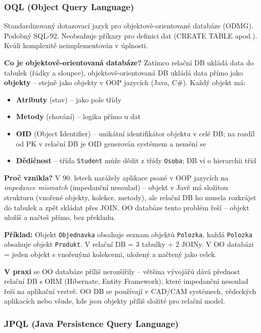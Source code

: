 \subsubsection{OQL (Object Query Language)}

Standardizovaný dotazovací jazyk pro objektově-orientované databáze (ODMG). Podobný SQL-92.
Neobsahuje příkazy pro definici dat (CREATE TABLE apod.). Kvůli komplexitě neimplementován v úplnosti.

\textbf{Co je objektově-orientovaná databáze?}
Zatímco relační DB ukládá data do tabulek (řádky a sloupce), objektově-orientovaná DB ukládá
data přímo jako \textbf{objekty} -- stejně jako objekty v OOP jazycích (Java, C\#).
Každý objekt má:
\begin{itemize}
  \item \textbf{Atributy} (stav) -- jako pole třídy
  \item \textbf{Metody} (chování) -- logika přímo u dat
  \item \textbf{OID} (Object Identifier) -- unikátní identifikátor objektu v celé DB; na rozdíl od PK v relační DB je OID generován systémem a nemění se
  \item \textbf{Dědičnost} -- třída \texttt{Student} může dědit z třídy \texttt{Osoba}; DB ví o hierarchii tříd
\end{itemize}

\textbf{Proč vznikla?} V 90. letech narážely aplikace psané v OOP jazycích na
\textit{impedance mismatch} (impedanční nesoulad) -- objekt v Javě má složitou strukturu
(vnořené objekty, kolekce, metody), ale relační DB ho musela rozkrájet do tabulek a zpět
skládat přes JOIN. OO databáze tento problém řeší -- objekt uložíš a načteš přímo, bez překladu.

\textbf{Příklad:} Objekt \texttt{Objednavka} obsahuje seznam objektů \texttt{Polozka},
každá \texttt{Polozka} obsahuje objekt \texttt{Produkt}. V relační DB = 3 tabulky + 2 JOINy.
V OO databázi = jeden objekt s vnořenými kolekcemi, uložený a načtený jako celek.

\textbf{V praxi} se OO databáze příliš nerozšířily -- většina vývojářů dává přednost
relační DB s ORM (Hibernate, Entity Framework), které impedanční nesoulad řeší na aplikační
vrstvě. OO DB se používají v CAD/CAM systémech, vědeckých aplikacích nebo všude,
kde jsou objekty příliš složité pro relační model.

\subsubsection{JPQL (Java Persistence Query Language)}

